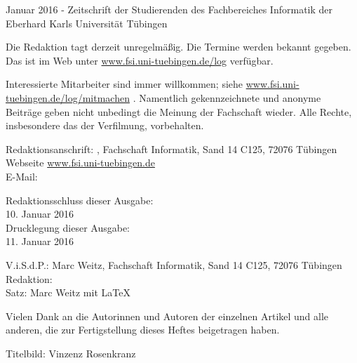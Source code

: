 \nameit \space \space Januar 2016 - Zeitschrift der Studierenden des Fachbereiches Informatik der Eberhard Karls Universität Tübingen

Die Redaktion tagt derzeit unregelmäßig. Die Termine werden  bekannt  gegeben.  Das  \nameit \space ist  im  Web  unter \url{www.fsi.uni-tuebingen.de/log} verfügbar.

Interessierte Mitarbeiter sind immer willkommen; 
siehe \url{www.fsi.uni-tuebingen.de/log/mitmachen}
.
Namentlich gekennzeichnete und anonyme Beiträge geben nicht unbedingt die Meinung der Fachschaft wieder. Alle Rechte, insbesondere das der Verfilmung, vorbehalten.

Redaktionsanschrift:
\nameit, Fachschaft Informatik, Sand 14 C125, 72076 Tübingen\\
Webseite \url{www.fsi.uni-tuebingen.de}\\
E-Mail:

Redaktionsschluss dieser Ausgabe:\\
10. Januar 2016\\
Drucklegung dieser Ausgabe:\\
11. Januar 2016

V.i.S.d.P.: Marc Weitz, Fachschaft Informatik, Sand 14 C125, 72076 Tübingen\\
Redaktion:\\
Satz: Marc Weitz mit \LaTeX 

Vielen Dank an die Autorinnen und Autoren der einzelnen Artikel und alle anderen, die zur Fertigstellung dieses Heftes beigetragen haben.

Titelbild: Vinzenz Rosenkranz

\newpage